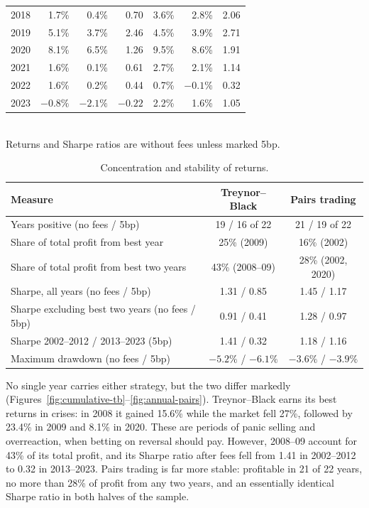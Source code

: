 \documentclass[12pt,letterpaper]{article}
\begin{document}
\begin{table}[H]
\begin{tabular}{lrrrrrr}
2018 & 1.7\% & 0.4\% & 0.70 & 3.6\% & 2.8\% & 2.06 \\
2019 & 5.1\% & 3.7\% & 2.46 & 4.5\% & 3.9\% & 2.71 \\
2020 & 8.1\% & 6.5\% & 1.26 & 9.5\% & 8.6\% & 1.91 \\
2021 & 1.6\% & 0.1\% & 0.61 & 2.7\% & 2.1\% & 1.14 \\
2022 & 1.6\% & 0.2\% & 0.44 & 0.7\% & $-0.1\%$ & 0.32 \\
2023 & $-0.8\%$ & $-2.1\%$ & $-0.22$ & 2.2\% & 1.6\% & 1.05 \\
\bottomrule
\end{tabular}
\\[4pt]
\small Returns and Sharpe ratios are without fees unless marked 5bp.
\end{table}

\begin{table}[H]
\centering
\caption{Concentration and stability of returns.}
\label{tab:regime}
\begin{tabular}{lcc}
\toprule
Measure & Treynor--Black & Pairs trading \\
\midrule
Years positive (no fees / 5bp) & 19 / 16 of 22 & 21 / 19 of 22 \\
Share of total profit from best year & 25\% (2009) & 16\% (2002) \\
Share of total profit from best two years & 43\% (2008--09) & 28\% (2002, 2020) \\
Sharpe, all years (no fees / 5bp) & 1.31 / 0.85 & 1.45 / 1.17 \\
Sharpe excluding best two years (no fees / 5bp) & 0.91 / 0.41 & 1.28 / 0.97 \\
Sharpe 2002--2012 / 2013--2023 (5bp) & 1.41 / 0.32 & 1.18 / 1.16 \\
Maximum drawdown (no fees / 5bp) & $-5.2\%$ / $-6.1\%$ & $-3.6\%$ / $-3.9\%$ \\
\bottomrule
\end{tabular}
\end{table}

No single year carries either strategy, but the two differ markedly (Figures~\ref{fig:cumulative-tb}--\ref{fig:annual-pairs}). Treynor--Black earns its best returns in crises: in 2008 it gained 15.6\% while the market fell 27\%, followed by 23.4\% in 2009 and 8.1\% in 2020. These are periods of panic selling and overreaction, when betting on reversal should pay. However, 2008--09 account for 43\% of its total profit, and its Sharpe ratio after fees fell from 1.41 in 2002--2012 to 0.32 in 2013--2023. Pairs trading is far more stable: profitable in 21 of 22 years, no more than 28\% of profit from any two years, and an essentially identical Sharpe ratio in both halves of the sample.
\end{document}
